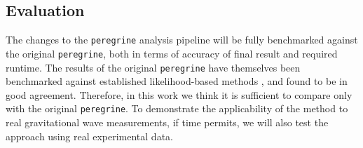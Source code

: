 \subsection{Evaluation}

The changes to the \texttt{peregrine} analysis pipeline will be fully benchmarked against the original \texttt{peregrine}, both in terms of accuracy of final result and required runtime. The results of the original \texttt{peregrine} have themselves been benchmarked against established likelihood-based methods \cite{Speagle_2020}, and found to be in good agreement. Therefore, in this work we think it is sufficient to compare only with the original \texttt{peregrine}. To demonstrate the applicability of the method to real gravitational wave measurements, if time permits, we will also test the approach using real experimental data.

